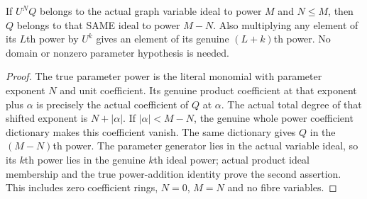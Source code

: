 \begin{lemma}
\label{hir:relative-normal-graph-weight-literal-parameter-cancellation}
\leanok
If $U^NQ$ belongs to the actual graph variable ideal to power $M$ and $N\leq M$, then $Q$ belongs to that SAME ideal to power $M-N$. Also multiplying any element of its $L$th power by $U^k$ gives an element of its genuine $(L+k)$th power. No domain or nonzero parameter hypothesis is needed.
\end{lemma}
\begin{proof}
The true parameter power is the literal monomial with parameter exponent $N$ and unit coefficient. Its genuine product coefficient at that exponent plus $\alpha$ is precisely the actual coefficient of $Q$ at $\alpha$. The actual total degree of that shifted exponent is $N+\lvert\alpha\rvert$. If $\lvert\alpha\rvert<M-N$, the genuine whole power coefficient dictionary makes this coefficient vanish. The same dictionary gives $Q$ in the $(M-N)$th power. The parameter generator lies in the actual variable ideal, so its $k$th power lies in the genuine $k$th ideal power; actual product ideal membership and the true power-addition identity prove the second assertion. This includes zero coefficient rings, $N=0$, $M=N$ and no fibre variables.
\end{proof}

